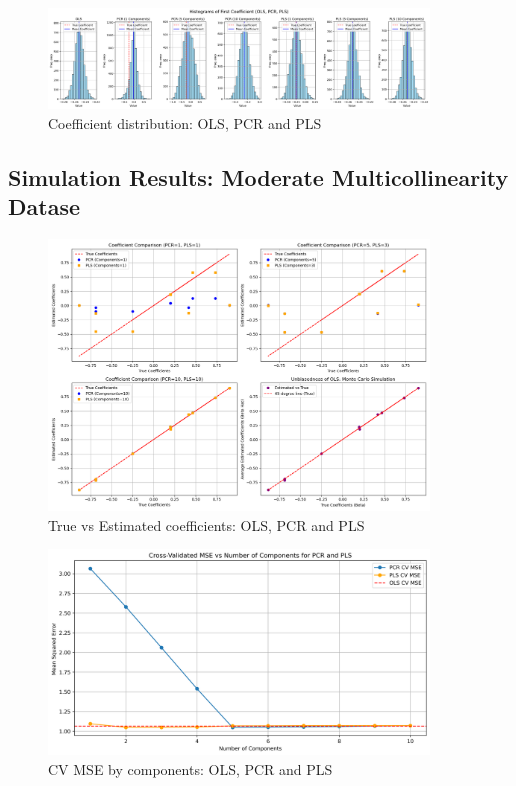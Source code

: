 \documentclass[11pt,twoside,a4paper]{article}
\begin{document}
\begin{figure}[H]
    \centering
    \includegraphics[width=0.9\textwidth]{Fourth_plot.png}
    \caption{Coefficient distribution: OLS, PCR and PLS}
    \label{fig:Classic_data_analysis}
\end{figure}

\subsection{Simulation Results: Moderate Multicollinearity Datase}

\begin{figure}[H]
    \centering
    \includegraphics[width=0.9\textwidth]{First_plot_second_simulation.png}
    \caption{True vs Estimated coefficients: OLS, PCR and PLS}
    \label{fig:Moderate_multicollinear_data_analysis}
\end{figure}

\begin{figure}[H]
    \centering
    \includegraphics[width=0.9\textwidth]{Second_plot_second_simulation.png}
    \caption{CV MSE by components: OLS, PCR and PLS}
    \label{fig:Moderate_multicollinear_data_analysis}
\end{figure}
\end{document}
